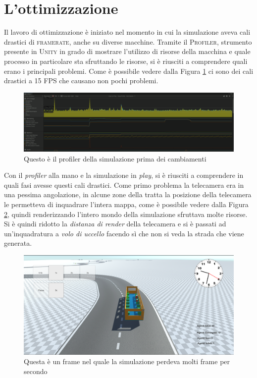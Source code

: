 \documentclass[12pt, openany]{book}
\begin{document}
 	\section{L'ottimizzazione}
 	Il lavoro di ottimizzazione è iniziato nel momento in cui la simulazione aveva cali drastici di \textsc{framerate}, anche su diverse macchine. Tramite il  \textsc{Profiler}, strumento presente in \textsc{Unity} in grado di mostrare l'utilizzo di risorse della macchina e quale processo in particolare sta sfruttando le risorse, si è riusciti a comprendere quali erano i principali problemi. Come è possibile vedere dalla Figura \ref{fig:ProfilerFPSBassi} ci sono dei cali drastici a 15 \textsc{FPS} che causano non pochi problemi.
 	\begin{figure}[H]
 		\centering
 		\includegraphics[width=1\linewidth]{"Immagini/ProfilerFPSBassi.png"}
 		\caption{Questo è il profiler della simulazione prima dei cambiamenti}
 		\label{fig:ProfilerFPSBassi}
 	\end{figure}
 	Con il \emph{profiler} alla mano e la simulazione in \emph{play}, si è riusciti a comprendere in quali fasi avesse questi cali drastici. Come primo problema la telecamera era in una pessima angolazione, in alcune zone della tratta la posizione della telecamera le permetteva di inquadrare l'intera mappa, come è possibile vedere dalla Figura \ref{fig:CameraBrutta}, quindi renderizzando l'intero mondo della simulazione sfruttava molte risorse. Si è quindi ridotto la \emph{distanza di render} della telecamera e si è passati ad un'inquadratura a \emph{volo di uccello} facendo sì che non si veda la strada che viene generata.
 	\begin{figure}[H]
 		\centering
 		\includegraphics[width=1\linewidth]{"Immagini/CameraBrutta.png"}
 		\caption{Questa è un frame nel quale la simulazione perdeva molti frame per secondo}
 		\label{fig:CameraBrutta}
 	\end{figure}
\end{document}
